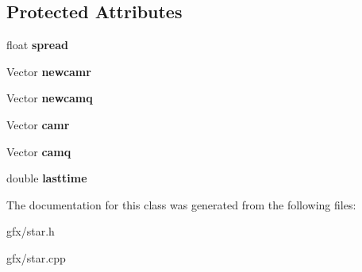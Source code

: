 \subsection*{Protected Attributes}
\begin{DoxyCompactItemize}
\item 
float {\bfseries spread}\hypertarget{classStarVlist_ad9a7ccd229911441afc9c495c7c9722b}{}\label{classStarVlist_ad9a7ccd229911441afc9c495c7c9722b}

\item 
Vector {\bfseries newcamr}\hypertarget{classStarVlist_a93efdb0e88247f9e4aa2040aaa52f040}{}\label{classStarVlist_a93efdb0e88247f9e4aa2040aaa52f040}

\item 
Vector {\bfseries newcamq}\hypertarget{classStarVlist_a2717fe8f6cc985011d56d2bfa5580ebb}{}\label{classStarVlist_a2717fe8f6cc985011d56d2bfa5580ebb}

\item 
Vector {\bfseries camr}\hypertarget{classStarVlist_a95f39afd25dacf3af949539c6c869232}{}\label{classStarVlist_a95f39afd25dacf3af949539c6c869232}

\item 
Vector {\bfseries camq}\hypertarget{classStarVlist_a646028e610f8334a600c80d270805cbc}{}\label{classStarVlist_a646028e610f8334a600c80d270805cbc}

\item 
double {\bfseries lasttime}\hypertarget{classStarVlist_a1d82cb2b0858e59aca7b5ca0b31291e0}{}\label{classStarVlist_a1d82cb2b0858e59aca7b5ca0b31291e0}

\end{DoxyCompactItemize}


The documentation for this class was generated from the following files\+:\begin{DoxyCompactItemize}
\item 
gfx/star.\+h\item 
gfx/star.\+cpp\end{DoxyCompactItemize}
